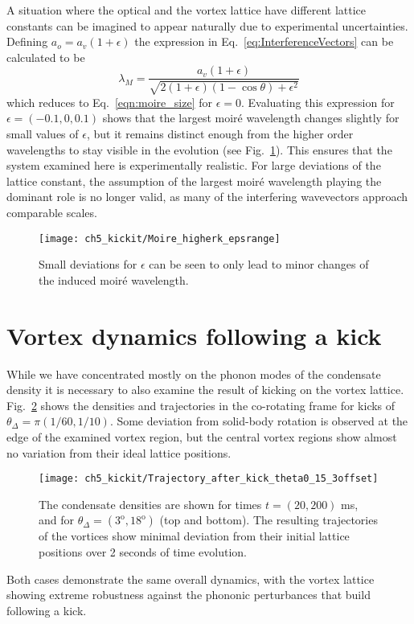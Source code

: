     A situation where the optical and the vortex lattice have different lattice constants can be imagined to appear naturally due to experimental uncertainties. Defining $a_o = a_v(1+\epsilon)$ the expression in Eq.~\eqref{eq:InterferenceVectors} can be calculated to be
    \begin{equation}
    	\lambda_M = \frac{a_v(1+\epsilon)}{\sqrt{2(1+\epsilon)(1-\cos\theta) + \epsilon^2}}
    	\label{eqn:moire_size_eps}
    \end{equation}
    which reduces to Eq.~\eqref{eqn:moire_size} for $\epsilon=0$. Evaluating this expression for $\epsilon = (-0.1,0,0.1)$ shows that the largest moir\'e wavelength changes slightly for small values of $\epsilon$, but it remains distinct enough from the higher order wavelengths to stay visible in the evolution (see Fig.~\ref{fig:epsilon}). This ensures that the system examined here is experimentally realistic. For large deviations of the lattice constant, the assumption of the largest moir\'e wavelength playing the dominant role is no longer valid, as many of the interfering wavevectors approach comparable scales.

    \begin{figure}
        \centering
        \texttt{[image: ch5\_kickit/Moire\_higherk\_epsrange]}
    	\caption[Moir\'e wavelengths for imperfect lattice alignment.]{Small deviations for $\epsilon$ can be seen to only lead to minor changes of the induced moir\'e wavelength.}\label{fig:epsilon}
    \end{figure}

\section{Vortex dynamics following a kick}\label{sec:moire_dyn_lattice}
While we have concentrated mostly on the phonon modes of the condensate density it is necessary to also examine the result of kicking on the vortex lattice. Fig.~\ref{fig:kickit_traj} shows the densities and trajectories in the co-rotating frame for kicks of $\theta_{\Delta}=\pi (1/60, 1/10)$. Some deviation from solid-body rotation is observed at the edge of the examined vortex region, but the central vortex regions show almost no variation from their ideal lattice positions.
\begin{figure}
    \centering
    \texttt{[image: ch5\_kickit/Trajectory\_after\_kick\_theta0\_15\_3offset]}
	\caption[Vortex densities and trajectories following a kick.]{The condensate densities are shown for times $t=(20,200)$ ms, and for $\theta_\Delta = ( 3^{\textrm{o}},18^{\textrm{o}})$ (top and bottom). The resulting trajectories of the vortices show minimal deviation from their initial lattice positions over 2 seconds of time evolution.}\label{fig:kickit_traj}
\end{figure}
Both cases demonstrate the same overall dynamics, with the vortex lattice showing extreme robustness against the phononic perturbances that build following a kick.

